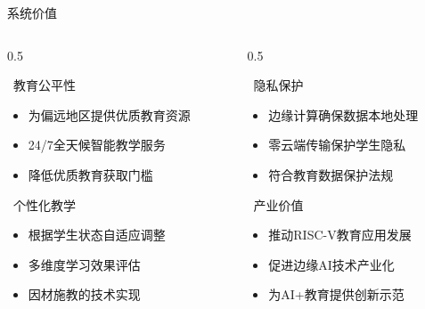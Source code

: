 \documentclass[aspectratio=169,12pt]{beamer}
\begin{document}
\begin{frame}{系统价值}
    \begin{columns}
        \begin{column}{0.5\textwidth}
            \begin{block}{\faBalanceScale\ 教育公平性}
                \begin{itemize}
                    \item 为偏远地区提供优质教育资源
                    \item 24/7全天候智能教学服务
                    \item 降低优质教育获取门槛
                \end{itemize}
            \end{block}
            
            \begin{block}{\faUser\ 个性化教学}
                \begin{itemize}
                    \item 根据学生状态自适应调整
                    \item 多维度学习效果评估
                    \item 因材施教的技术实现
                \end{itemize}
            \end{block}
        \end{column}
        \begin{column}{0.5\textwidth}
            \begin{block}{\faShield\ 隐私保护}
                \begin{itemize}
                    \item 边缘计算确保数据本地处理
                    \item 零云端传输保护学生隐私
                    \item 符合教育数据保护法规
                \end{itemize}
            \end{block}
            
            \begin{block}{\faIndustry\ 产业价值}
                \begin{itemize}
                    \item 推动RISC-V教育应用发展
                    \item 促进边缘AI技术产业化
                    \item 为AI+教育提供创新示范
                \end{itemize}
            \end{block}
        \end{column}
    \end{columns}
\end{frame}
\end{document}
